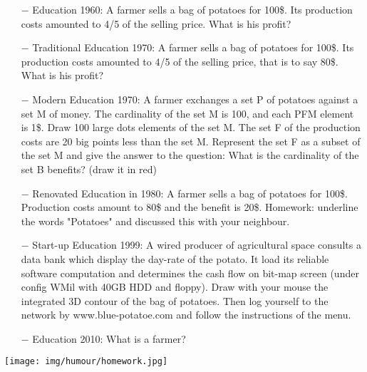 \begin{itemize}	 
	\item[$-$] Education 1960: A farmer sells a bag of potatoes for 100\$. Its production costs amounted to 4/5 of the selling price. What is his profit?

	\item[$-$] Traditional Education 1970: A farmer sells a bag of potatoes for 100\$. Its production costs amounted to 4/5 of the selling price, that is to say 80\$. What is his profit?

	\item[$-$] Modern Education 1970: A farmer exchanges a set P of potatoes against a set M of money. The cardinality of the set M is 100, and each PFM element is 1\$. Draw 100 large dots elements of the set M. The set F of the production costs are 20 big points less than the set M. Represent the set F as a subset of the set M and give the answer to the question: What is the cardinality of the set B benefits? (draw it in red)

	\item[$-$] Renovated Education in 1980: A farmer sells a bag of potatoes for 100\$. Production costs amount to 80\$ and the benefit is 20\$. Homework: underline the words "Potatoes" and discussed this with your neighbour.

	\item[$-$] Start-up Education 1999: A wired producer of agricultural space consults a data bank which
display the day-rate of the potato. It load its reliable software computation and determines the cash flow on bit-map screen (under config WMil with 40GB HDD and floppy). Draw with your mouse the integrated 3D contour of the bag of potatoes. Then log yourself to the network by www.blue-potatoe.com and follow the instructions of the menu.

	\item[$-$] Education 2010: What is a farmer?

\end{itemize}
	\begin{center}\underline{\hspace{5 cm}}\end{center}
	\begin{center}
		\texttt{[image: img/humour/homework.jpg]}	
	\end{center}

